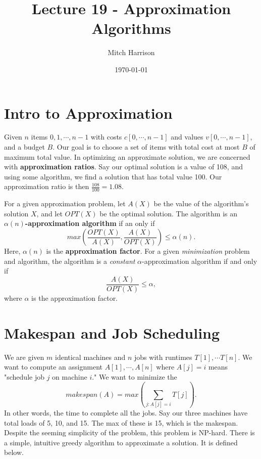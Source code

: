 \documentclass[titlepage, 12pt, leqno]{article}
\title{\Huge{Lecture 19 - Approximation Algorithms}}
\author{\large{Mitch Harrison}}
\date{\today}
\begin{document}
\setlength{\parskip}{1\baselineskip}
\setlength{\parindent}{15pt}
\maketitle
\tableofcontents
\newpage


\section{Intro to Approximation}

Given $n$ items $0,1, \cdots , n-1$ with costs $c[0, \cdots, n-1]$ and values
$v[0, \cdots ,n-1]$, and a budget $B$. Our goal is to choose a set of items with
total cost at most $B$ of maximum total value. In optimizing an approximate
solution, we are concerned with \textbf{approximation ratios}. Say our optimal
solution is a value of 108, and using some algorithm, we find a solution that
has total value 100. Our approximation ratio is then $\frac{108}{100} = 1.08$.

For a given approximation problem, let $A(X)$ be the value of the algorithm's
solution $X$, and let $OPT(X)$ be the optimal solution. The algorithm is an
\textbf{$\alpha(n)$-approximation algorithm} if an only if
\[
max\left(\frac{OPT(X)}{A(X)}, \frac{A(X)}{OPT(X)}\right) \le \alpha(n).
\]
Here, $\alpha(n)$ is the \textbf{approximation factor}.  For a given
\textit{minimization} problem and algorithm, the algorithm is a
\textit{constant} $\alpha$-approximation algorithm if and only if
\[
\frac{A(X)}{OPT(X)} \le \alpha,
\]
where $\alpha$ is the approximation factor.

\pagebreak
\section{Makespan and Job Scheduling}
We are given $m$ identical machines and $n$ jobs with runtimes $T[1], 
\cdots T[n]$. We want to compute an assignment $A[1], \cdots ,A[n]$ where
$A[j] = i$ means "schedule job $j$ on machine $i$." We want to minimize the
\[
    makespan(A) = max\left(\sum _{j:A[j]=i}T[j]\right).
\]
In other words, the time to complete all the jobs. Say our three machines have
total loads of 5, 10, and 15. The max of these is 15, which is the makespan.
Despite the seeming simplicity of the problem, this problem is NP-hard.
There is a simple, intuitive greedy algorithm to approximate a solution. It is
defined below.
\end{document}
